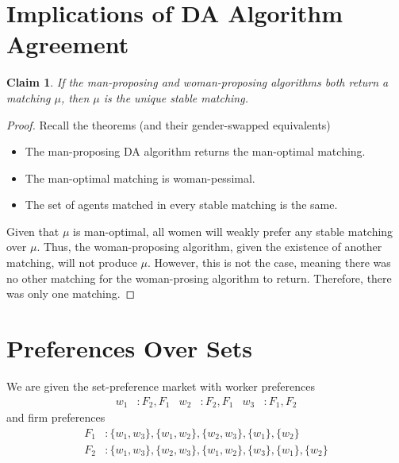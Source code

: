 \documentclass[12pt]{article}
\newtheorem*{claim}{Claim}
\begin{document}
\section{Implications of DA Algorithm Agreement}
\begin{claim}
If the man-proposing and woman-proposing algorithms both return a matching $\mu$, then $\mu$ is the unique stable matching.
\end{claim}
\begin{proof}
Recall the theorems (and their gender-swapped equivalents)
\begin{itemize}
\item The man-proposing DA algorithm returns the man-optimal matching.
\item The man-optimal matching is woman-pessimal.
\item The set of agents matched in every stable matching is the same.
\end{itemize}

Given that $\mu$ is man-optimal, all women will weakly prefer any stable matching over $\mu$. Thus, the woman-proposing algorithm, given the existence of another matching, will not produce $\mu$. However, this is not the case, meaning there was no other matching for the woman-prosing algorithm to return. Therefore, there was  only one matching.
\end{proof}

\section{Preferences Over Sets}
We are given the set-preference market with worker preferences
\begin{align*}
w_1 &: F_2, F_1 & w_2&: F_2, F_1 & w_3 &: F_1, F_2
\end{align*}
\noindent and firm preferences
\begin{align*}
F_1&: \{w_1, w_3\}, \{w_1, w_2\},
\{w_2, w_3\}, \{w_1\}, \{w_2\}\\
F_2&: \{w_1, w_3\}, \{w_2, w_3\}, \{w_1, w_2\},\{w_3\}, \{w_1\}, \{w_2\}
\end{align*}
\end{document}
